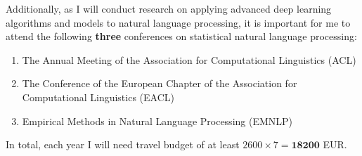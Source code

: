 \documentclass[11pt, oneside]{essay}
\begin{document}
Additionally, as I will conduct research on applying advanced
deep learning algorithms and models to natural language
processing, it is important for me to attend the following
\textbf{three} conferences on statistical natural language processing:
\begin{enumerate}
    \item The Annual Meeting of the Association for Computational
    Linguistics (ACL)
    \item The Conference of the European Chapter of the
    Association for Computational Linguistics (EACL)
    \item Empirical Methods in Natural Language Processing
    (EMNLP)
\end{enumerate}

In total, each year I will need travel budget of at least $2600
\times 7 = \mathbf{18200}$ EUR.






%
%
\end{document}
